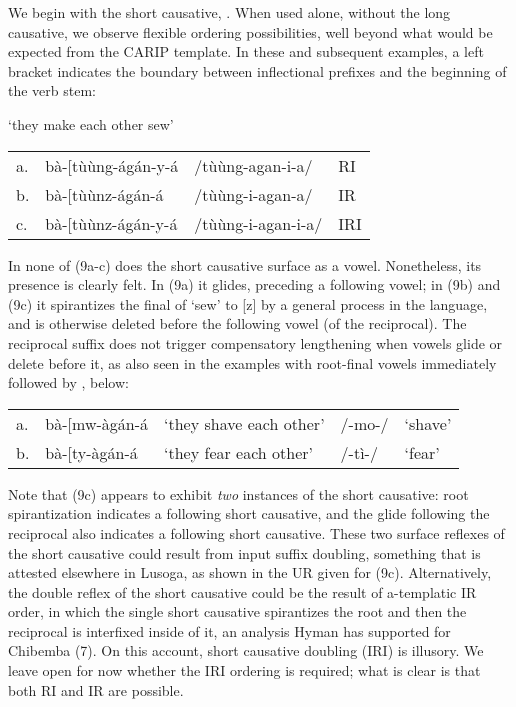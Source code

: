 \documentclass[output=paper,
modfonts
]{LSP/langsci}
\begin{document}
We begin with the short causative, . When used alone, without
the long causative, we observe flexible ordering possibilities, well
beyond what would be expected from the CARIP template. In these and
subsequent examples, a left bracket indicates the boundary between
inflectional prefixes and the beginning of the verb stem:

\ea `they make each other sew'\\
\begin{tabular}[t]{@{}llll@{}}
a. & bà-{[}tùùng-ágán-y-á & /tùùng-agan-i-a/ & RI \\
b. & bà-{[}tùùnz-ágán-á & /tùùng-i-agan-a/  & IR \\
c. & bà-{[}tùùnz-ágán-y-á & /tùùng-i-agan-i-a/ & IRI \\
\end{tabular}
\z

\noindent In none of (9a-c) does the short causative  surface as a
vowel. Nonetheless, its presence is clearly felt. In (9a) it glides,
preceding a following vowel; in (9b) and (9c) it spirantizes the final
 of  `sew' to {[}z{]} by a general process in the language,
and is otherwise deleted before the following vowel (of the reciprocal).
The reciprocal suffix  does not trigger compensatory
lengthening when vowels glide or delete before it, as also seen in the
examples with root-final vowels immediately followed by ,
below:

\ea\begin{tabular}[t]{@{}lllll}
a. & bà-{[}mw-àgán-á & `they shave each other' & /-mo-/ & `shave'\\
b. & bà-{[}ty-àgán-á & `they fear each other' & /-tì-/ & `fear'
\end{tabular}
\z

\noindent Note that (9c) appears to exhibit \emph{two} instances of the short
causative: root spirantization indicates a following short causative,
and the glide following the reciprocal also indicates a following short
causative. These two surface reflexes of the short causative could
result from input suffix doubling, something that is attested elsewhere
in Lusoga, as shown in the UR given for (9c). Alternatively, the double
reflex of the short causative could be the result of a-templatic IR
order, in which the single short causative spirantizes the root and then
the reciprocal is interfixed inside of it, an analysis Hyman has
supported for Chibemba (7). On this account, short causative doubling
(IRI) is illusory. We leave open for now whether the IRI ordering is
required; what is clear is that both RI and IR are possible.
\end{document}
